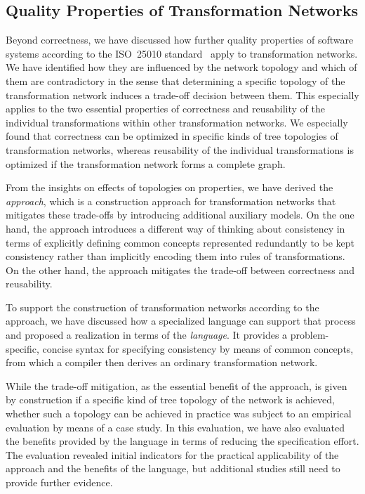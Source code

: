 \subsection{Quality Properties of Transformation Networks}

Beyond correctness, we have discussed how further quality properties of software systems according to the ISO~25010 standard~\cite{iso25010} apply to transformation networks.
We have identified how they are influenced by the network topology and which of them are contradictory in the sense that determining a specific topology of the transformation network induces a trade-off decision between them.
This especially applies to the two essential properties of correctness and reusability of the individual transformations within other transformation networks.
We especially found that correctness can be optimized in specific kinds of tree topologies of transformation networks, whereas reusability of the individual transformations is optimized if the transformation network forms a complete graph.

From the insights on effects of topologies on properties, we have derived the \emph{\commonalities approach}, which is a construction approach for transformation networks that mitigates these trade-offs by introducing additional auxiliary models.
On the one hand, the approach introduces a different way of thinking about consistency in terms of explicitly defining common concepts represented redundantly to be kept consistency rather than implicitly encoding them into rules of transformations.
On the other hand, the approach mitigates the trade-off between correctness and reusability.

To support the construction of transformation networks according to the \commonalities approach, we have discussed how a specialized language can support that process and proposed a realization in terms of the \emph{\commonalities language}.
It provides a problem-specific, concise syntax for specifying consistency by means of common concepts, from which a compiler then derives an ordinary transformation network.

While the trade-off mitigation, as the essential benefit of the approach, is given by construction if a specific kind of tree topology of the network is achieved, whether such a topology can be achieved in practice was subject to an empirical evaluation by means of a case study.
In this evaluation, we have also evaluated the benefits provided by the \commonalities language in terms of reducing the specification effort.
The evaluation revealed initial indicators for the practical applicability of the approach and the benefits of the language, but additional studies still need to provide further evidence.

